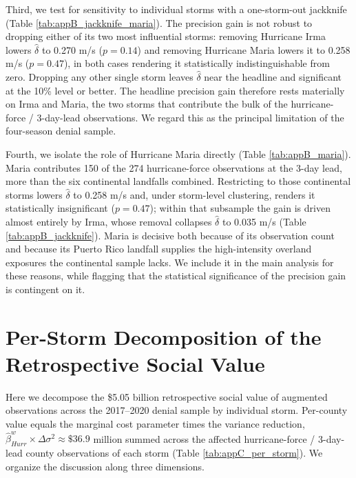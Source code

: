 \documentclass[12pt]{article}%
\begin{document}
\begin{appendices}
Third, we test for sensitivity to individual storms with a one-storm-out jackknife (Table \ref{tab:appB_jackknife_maria}). The precision gain is not robust to dropping either of its two most influential storms: removing Hurricane Irma lowers $\hat{\delta}$ to 0.270 m/s ($p = 0.14$) and removing Hurricane Maria lowers it to 0.258 m/s ($p = 0.47$), in both cases rendering it statistically indistinguishable from zero. Dropping any other single storm leaves $\hat{\delta}$ near the headline and significant at the 10\% level or better. The headline precision gain therefore rests materially on Irma and Maria, the two storms that contribute the bulk of the hurricane-force / 3-day-lead observations. We regard this as the principal limitation of the four-season denial sample.

Fourth, we isolate the role of Hurricane Maria directly (Table \ref{tab:appB_maria}). Maria contributes 150 of the 274 hurricane-force observations at the 3-day lead, more than the six continental landfalls combined. Restricting to those continental storms lowers $\hat{\delta}$ to 0.258 m/s and, under storm-level clustering, renders it statistically insignificant ($p = 0.47$); within that subsample the gain is driven almost entirely by Irma, whose removal collapses $\hat{\delta}$ to 0.035 m/s (Table \ref{tab:appB_jackknife}). Maria is decisive both because of its observation count and because its Puerto Rico landfall supplies the high-intensity overland exposures the continental sample lacks. We include it in the main analysis for these reasons, while flagging that the statistical significance of the precision gain is contingent on it.








\clearpage

\section{Per-Storm Decomposition of the Retrospective Social Value} \label{app:per-storm}

Here we decompose the \$5.05 billion retrospective social value of augmented observations across the 2017--2020 denial sample by individual storm. Per-county value equals the marginal cost parameter times the variance reduction, $\hat{\beta}^{w}_{Hurr} \times \Delta\sigma^{2} \approx \$36.9$ million summed across the affected hurricane-force / 3-day-lead county observations of each storm (Table \ref{tab:appC_per_storm}). We organize the discussion along three dimensions.


\end{appendices}
\end{document}

